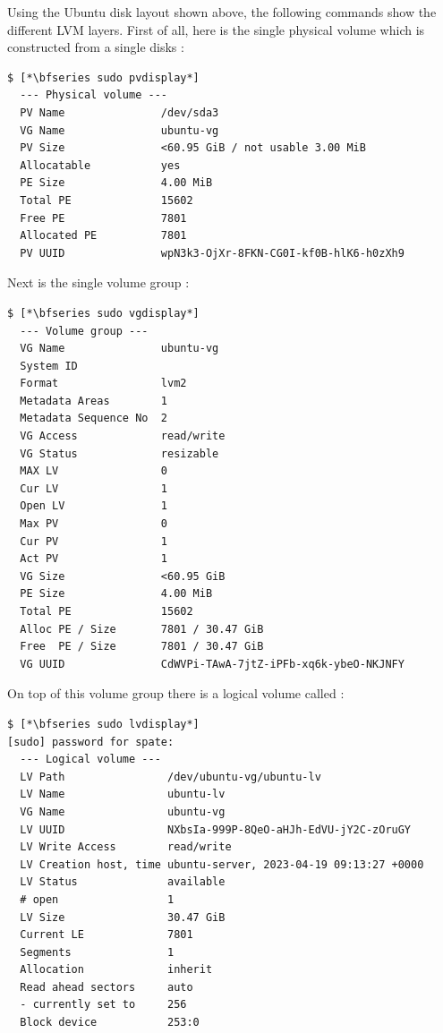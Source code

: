 \noindent
Using the Ubuntu disk layout shown above, the following commands show the different LVM layers. First of all, here is the single physical volume which is constructed from a single disks :

\begin{lstlisting}   
$ [*\bfseries sudo pvdisplay*]
  --- Physical volume ---
  PV Name               /dev/sda3
  VG Name               ubuntu-vg
  PV Size               <60.95 GiB / not usable 3.00 MiB
  Allocatable           yes 
  PE Size               4.00 MiB
  Total PE              15602
  Free PE               7801
  Allocated PE          7801
  PV UUID               wpN3k3-OjXr-8FKN-CG0I-kf0B-hlK6-h0zXh9
\end{lstlisting}

\noindent
Next is the single volume group :

\begin{lstlisting}   
$ [*\bfseries sudo vgdisplay*]
  --- Volume group ---
  VG Name               ubuntu-vg
  System ID             
  Format                lvm2
  Metadata Areas        1
  Metadata Sequence No  2
  VG Access             read/write
  VG Status             resizable
  MAX LV                0
  Cur LV                1
  Open LV               1
  Max PV                0
  Cur PV                1
  Act PV                1
  VG Size               <60.95 GiB
  PE Size               4.00 MiB
  Total PE              15602
  Alloc PE / Size       7801 / 30.47 GiB
  Free  PE / Size       7801 / 30.47 GiB
  VG UUID               CdWVPi-TAwA-7jtZ-iPFb-xq6k-ybeO-NKJNFY
\end{lstlisting}

\noindent
On top of this volume group there is a logical volume called :

\begin{lstlisting}
$ [*\bfseries sudo lvdisplay*]
[sudo] password for spate: 
  --- Logical volume ---
  LV Path                /dev/ubuntu-vg/ubuntu-lv
  LV Name                ubuntu-lv
  VG Name                ubuntu-vg
  LV UUID                NXbsIa-999P-8QeO-aHJh-EdVU-jY2C-zOruGY
  LV Write Access        read/write
  LV Creation host, time ubuntu-server, 2023-04-19 09:13:27 +0000
  LV Status              available
  # open                 1
  LV Size                30.47 GiB
  Current LE             7801
  Segments               1
  Allocation             inherit
  Read ahead sectors     auto
  - currently set to     256
  Block device           253:0
\end{lstlisting}

